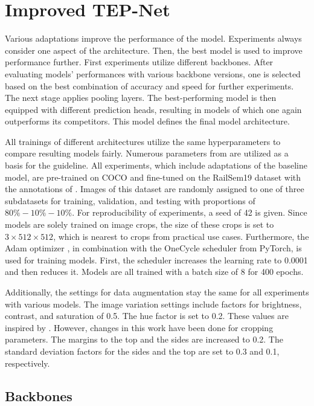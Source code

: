 \section{Improved TEP-Net}

Various adaptations improve the performance of the model.
Experiments always consider one aspect of the architecture.
Then, the best model is used to improve performance further.
First experiments utilize different backbones.
After evaluating models' performances with various backbone versions, one is selected based on the best combination of accuracy and speed for further experiments.
The next stage applies pooling layers.
The best-performing model is then equipped with different prediction heads, resulting in models of which one again outperforms its competitors.
This model defines the final model architecture.

All trainings of different architectures utilize the same hyperparameters to compare resulting models fairly.
Numerous parameters from \cite{tepNet2024} are utilized as a basis for the guideline.
All experiments, which include adaptations of the baseline model, are pre-trained on COCO and fine-tuned on the RailSem19 dataset with the annotations of \cite{tepNet2024}.
Images of this dataset are randomly assigned to one of three subdatasets for training, validation, and testing with proportions of $80\%-10\%-10\%$.
For reproducibility of experiments, a seed of 42 is given.
Since models are solely trained on image crops, the size of these crops is set to $3 \times 512 \times 512$, which is nearest to crops from practical use cases.
Furthermore, the Adam optimizer \cite{pytorchAdamOptimizer}, in combination with the OneCycle scheduler \cite{pytorch_oneCycleLR_docu} from PyTorch, is used for training models.
First, the scheduler increases the learning rate to 0.0001 and then reduces it.
Models are all trained with a batch size of 8 for 400 epochs.

Additionally, the settings for data augmentation stay the same for all experiments with various models.
The image variation settings include factors for brightness, contrast, and saturation of 0.5.
The hue factor is set to 0.2.
These values are inspired by \cite{tepNet2024}.
However, changes in this work have been done for cropping parameters.
The margins to the top and the sides are increased to 0.2.
The standard deviation factors for the sides and the top are set to 0.3 and 0.1, respectively.

\subsection{Backbones}

